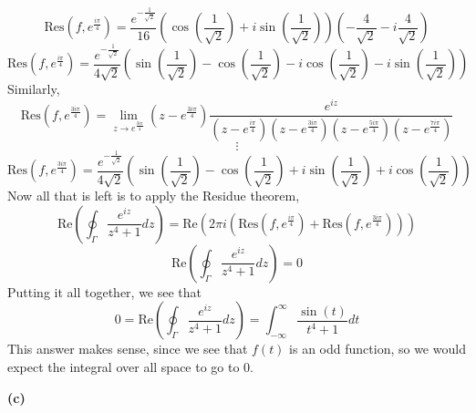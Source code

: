 \documentclass[10pt]{article}
\begin{document}
$$\text{Res}(f,e^\frac{i\pi}{4}) = \frac{e^{-\frac{1}{\sqrt{2}}}}{16}\left(\cos\left(\frac{1}{\sqrt{2}}\right) + i\sin\left(\frac{1}{\sqrt{2}}\right)\right)\left(-\frac{4}{\sqrt{2}} - i\frac{4}{\sqrt{2}}\right)$$
$$\text{Res}(f,e^\frac{i\pi}{4}) =  \frac{e^{-\frac{1}{\sqrt{2}}}}{4\sqrt{2}}\left(\sin\left(\frac{1}{\sqrt{2}}\right) - \cos\left(\frac{1}{\sqrt{2}}\right) - i\cos\left(\frac{1}{\sqrt{2}}\right) - i\sin\left(\frac{1}{\sqrt{2}}\right)\right)$$
Similarly,
$$\text{Res}(f,e^{\frac{3i\pi}{4}}) = \lim_{z\to e^{\frac{3i\pi}{4}}}\left(z-e^{\frac{3i\pi}{4}}\right)\frac{e^{iz}}{\left(z - e^{\frac{i\pi}{4}}\right)\left(z - e^{\frac{3i\pi}{4}}\right)\left(z-e^{\frac{5i\pi}{4}}\right)\left(z-e^{\frac{7i\pi}{4}}\right)}$$
$$\vdots$$
$$\text{Res}(f,e^{\frac{3i\pi}{4}}) =  \frac{e^{-\frac{1}{\sqrt{2}}}}{4\sqrt{2}}\left(\sin\left(\frac{1}{\sqrt{2}}\right) - \cos\left(\frac{1}{\sqrt{2}}\right) + i\sin\left(\frac{1}{\sqrt{2}}\right) + i\cos\left(\frac{1}{\sqrt{2}}\right)\right)$$
Now all that is left is to apply the Residue theorem,
$$\text{Re}\left(\oint_{\Gamma}\frac{e^{iz}}{z^{4} + 1}dz\right) = \text{Re}\left(2\pi i\left(\text{Res}(f,e^{\frac{i\pi}{4}}) + \text{Res}(f,e^{\frac{3i\pi}{4}})\right)\right)$$
$$\text{Re}\left(\oint_{\Gamma}\frac{e^{iz}}{z^{4} + 1}dz\right) = 0$$
Putting it all together, we see that
$$0 = \text{Re}\left(\oint_{\Gamma}\frac{e^{iz}}{z^{4} + 1}dz\right) = \int_{-\infty}^{\infty}\frac{\sin(t)}{t^{4} + 1}dt$$
This answer makes sense, since we see that $f(t)$ is an odd function, so we would expect the integral over all space to go to 0.

\textbf{(c)}
\end{document}
